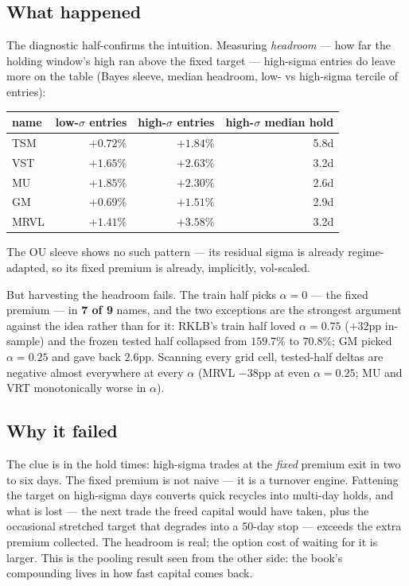 \documentclass[11pt,a4paper]{article}
\newcommand{\tabnote}[1]{\begin{center}\begin{minipage}{0.92\textwidth}
  \footnotesize\color{bcgrey}#1\end{minipage}\end{center}}
\newcommand{\bad}[1]{{\color{bcred}\textbf{#1}}}
\begin{document}
\subsection{What happened}

The diagnostic half-confirms the intuition. Measuring \emph{headroom} --- how far
the holding window's high ran above the fixed target --- high-sigma entries do
leave more on the table (Bayes sleeve, median headroom, low- vs high-sigma
tercile of entries):

\begin{center}
\begin{tabular}{lrrr}
\toprule
name & low-$\sigma$ entries & high-$\sigma$ entries & high-$\sigma$ median hold \\
\midrule
TSM  & $+0.72\%$ & $+1.84\%$ & 5.8d \\
VST  & $+1.65\%$ & $+2.63\%$ & 3.2d \\
MU   & $+1.85\%$ & $+2.30\%$ & 2.6d \\
GM   & $+0.69\%$ & $+1.51\%$ & 2.9d \\
MRVL & $+1.41\%$ & $+3.58\%$ & 3.2d \\
\bottomrule
\end{tabular}
\end{center}

\tabnote{The OU sleeve shows no such pattern --- its residual sigma is already
regime-adapted, so its fixed premium is already, implicitly, vol-scaled.}

But harvesting the headroom fails. The train half picks $\alpha=0$ --- the fixed
premium --- in \bad{7 of 9} names, and the two exceptions are the strongest
argument against the idea rather than for it: RKLB's train half loved
$\alpha=0.75$ ($+32$pp in-sample) and the frozen tested half collapsed from
$159.7\%$ to $70.8\%$; GM picked $\alpha=0.25$ and gave back $2.6$pp. Scanning
every grid cell, tested-half deltas are negative almost everywhere at every
$\alpha$ (MRVL $-38$pp at even $\alpha=0.25$; MU and VRT monotonically worse in
$\alpha$).

\subsection{Why it failed}

The clue is in the hold times: high-sigma trades at the \emph{fixed} premium exit
in two to six days. The fixed premium is not naive --- it is a turnover engine.
Fattening the target on high-sigma days converts quick recycles into multi-day
holds, and what is lost --- the next trade the freed capital would have taken,
plus the occasional stretched target that degrades into a 50-day stop --- exceeds
the extra premium collected. The headroom is real; the option cost of waiting for
it is larger. This is the pooling result seen from the other side: the book's
compounding lives in how fast capital comes back.
\end{document}
